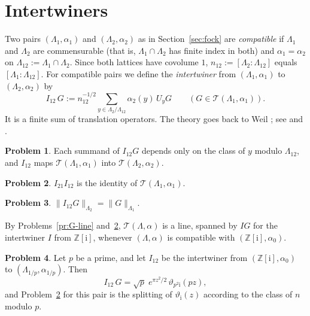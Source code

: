 \documentclass[reqno]{amsart}
\theoremstyle{definition}
\newtheorem{problem}{Problem}[section]
\theoremstyle{plain}
\newcommand{\Z}{\mathbb{Z}}
\newcommand{\ii}{\mathrm{i}}
\begin{document}
\section{Intertwiners}\label{sec:intertwiners}

Two pairs \((\Lambda_1,\alpha_1)\) and \((\Lambda_2,\alpha_2)\) as in Section~\ref{sec:fock} are \emph{compatible} if \(\Lambda_1\) and \(\Lambda_2\) are commensurable (that is, \(\Lambda_1 \cap \Lambda_2\) has finite index in both) and \(\alpha_1 = \alpha_2\) on \(\Lambda_{12} := \Lambda_1 \cap \Lambda_2\).  Since both lattices have covolume \(1\), \(n_{12} := [\Lambda_2 : \Lambda_{12}]\) equals \([\Lambda_1 : \Lambda_{12}]\).  For compatible pairs we define the \emph{intertwiner} from \((\Lambda_1,\alpha_1)\) to \((\Lambda_2,\alpha_2)\) by
\[
  I_{12}\, G := n_{12}^{-1/2} \sum_{y \in \Lambda_2/\Lambda_{12}} \alpha_2(y)\, U_y G \qquad (G \in \mathcal{T}(\Lambda_1,\alpha_1)) .
\]
It is a finite sum of translation operators.  The theory goes back to Weil \cite{We}; see \cite[Ch.~4]{Pol} and \cite{LV}.

\begin{problem}\label{pr:I-def}
Each summand of \(I_{12}G\) depends only on the class of \(y\) modulo \(\Lambda_{12}\), and \(I_{12}\) maps \(\mathcal{T}(\Lambda_1,\alpha_1)\) into \(\mathcal{T}(\Lambda_2,\alpha_2)\).
\end{problem}

\begin{problem}\label{pr:I-inverse}
\(I_{21} I_{12}\) is the identity of \(\mathcal{T}(\Lambda_1,\alpha_1)\).
\end{problem}

\begin{problem}\label{pr:I-isometry}
\(\lVert I_{12}G\rVert_{\Lambda_2} = \lVert G\rVert_{\Lambda_1}\).
\end{problem}

By Problems~\ref{pr:G-line} and~\ref{pr:I-inverse}, \(\mathcal{T}(\Lambda,\alpha)\) is a line, spanned by \(I G\) for the intertwiner \(I\) from \(\Z[\ii]\), whenever \((\Lambda,\alpha)\) is compatible with \((\Z[\ii],\alpha_0)\).

\begin{problem}\label{pr:I-explicit}
Let \(p\) be a prime, and let \(I_{12}\) be the intertwiner from \((\Z[\ii],\alpha_0)\) to \((\Lambda_{1/p}, \alpha_{1/p})\).  Then
\[
  I_{12}\, G = \sqrt p\; e^{\pi z^2/2}\, \vartheta_{p^2\ii}(pz) ,
\]
and Problem~\ref{pr:I-inverse} for this pair is the splitting of \(\vartheta_\ii(z)\) according to the class of \(n\) modulo \(p\).
\end{problem}
\end{document}
